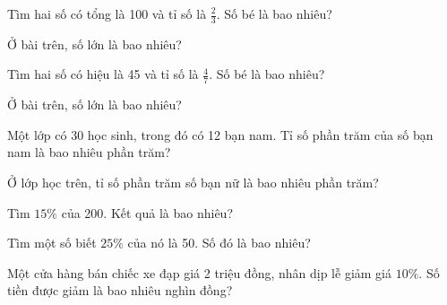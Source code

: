 
\begin{ex}
  Tìm hai số có tổng là 100 và tỉ số là $\frac{2}{3}$. Số bé là bao nhiêu?
\end{ex}

\begin{ex}
  Ở bài trên, số lớn là bao nhiêu?
\end{ex}

\begin{ex}
  Tìm hai số có hiệu là 45 và tỉ số là $\frac{4}{7}$. Số bé là bao nhiêu?
\end{ex}

\begin{ex}
  Ở bài trên, số lớn là bao nhiêu?
\end{ex}

\begin{ex}
  Một lớp có 30 học sinh, trong đó có 12 bạn nam. Tỉ số phần trăm của số bạn nam là bao nhiêu phần trăm?
\end{ex}

\begin{ex}
  Ở lớp học trên, tỉ số phần trăm số bạn nữ là bao nhiêu phần trăm?
\end{ex}

\begin{ex}
  Tìm $15\%$ của 200. Kết quả là bao nhiêu?
\end{ex}

\begin{ex}
  Tìm một số biết $25\%$ của nó là 50. Số đó là bao nhiêu?
\end{ex}

\begin{ex}
  Một cửa hàng bán chiếc xe đạp giá 2 triệu đồng, nhân dịp lễ giảm giá $10\%$. Số tiền được giảm là bao nhiêu nghìn đồng?
\end{ex}

